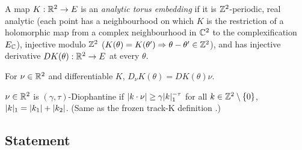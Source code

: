 \begin{definition}\label{bpW:wh:embedding}
A map $K:\mathbb{R}^2\to E$ is an \emph{analytic torus embedding} if it is $\mathbb{Z}^2$-periodic, real analytic (each point has a
neighbourhood on which $K$ is the restriction of a holomorphic map from a complex neighbourhood in $\mathbb{C}^2$ to the
complexification $E_{\mathbb{C}}$), injective modulo $\mathbb{Z}^2$ ($K(\theta)=K(\theta')\Rightarrow\theta-\theta'\in\mathbb{Z}^2$), and has
injective derivative $DK(\theta):\mathbb{R}^2\to E$ at every $\theta$.
\end{definition}

\begin{definition}\label{bpW:wh:Dnu}
For $\nu\in\mathbb{R}^2$ and differentiable $K$, $D_\nu K(\theta)=DK(\theta)\nu$.
\end{definition}

\begin{definition}[Diophantine]\label{bpW:wh:dioph}
$\nu\in\mathbb{R}^2$ is $(\gamma,\tau)$-Diophantine if $\lvert k\cdot\nu\rvert\ge\gamma\lvert k\rvert_1^{-\tau}$ for all
$k\in\mathbb{Z}^2\setminus\{0\}$, $\lvert k\rvert_1=\lvert k_1\rvert+\lvert k_2\rvert$. (Same as the frozen track-K definition
.)
\end{definition}

\subsection{Statement}\label{bpW:wh:statement}

